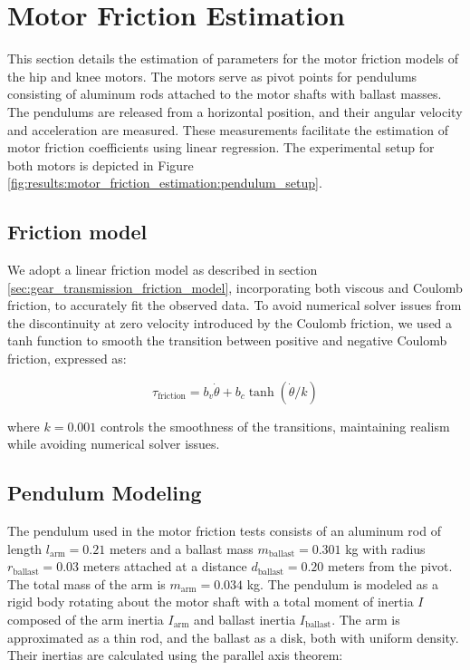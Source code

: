 \section{Motor Friction Estimation}
\label{sec:motor_friction_estimation}

This section details the estimation of parameters for the motor friction models of the hip and knee motors. The motors serve as pivot points for pendulums consisting of aluminum rods attached to the motor shafts with ballast masses. The pendulums are released from a horizontal position, and their angular velocity and acceleration are measured. These measurements facilitate the estimation of motor friction coefficients using linear regression. The experimental setup for both motors is depicted in Figure \ref{fig:results:motor_friction_estimation:pendulum_setup}.

\subsection{Friction model}
We adopt a linear friction model as described in section \ref{sec:gear_transmission_friction_model}, incorporating both viscous and Coulomb friction, to accurately fit the observed data. To avoid numerical solver issues from the discontinuity at zero velocity introduced by the Coulomb friction, we used a tanh function to smooth the transition between positive and negative Coulomb friction, expressed as:

\begin{equation}
\label{eq:friction_model}
\tau_{\text{friction}} = b_v \dot{\theta} + b_c \tanh( \dot{\theta} / k)
\end{equation}

where \(k = 0.001\) controls the smoothness of the transitions, maintaining realism while avoiding numerical solver issues.

\subsection{Pendulum Modeling}
The pendulum used in the motor friction tests consists of an aluminum rod of length \( l_{\text{arm}} = 0.21 \) meters and a ballast mass \( m_{\text{ballast}} = 0.301 \) kg with radius \( r_{\text{ballast}} = 0.03 \) meters attached at a distance \( d_{\text{ballast}} = 0.20 \) meters from the pivot. The total mass of the arm is \( m_{\text{arm}} = 0.034 \) kg. The pendulum is modeled as a rigid body rotating about the motor shaft with a total moment of inertia \( I \) composed of the arm inertia \( I_{\text{arm}} \) and ballast inertia \( I_{\text{ballast}} \). The arm is approximated as a thin rod, and the ballast as a disk, both with uniform density. Their inertias are calculated using the parallel axis theorem:

